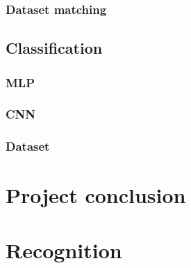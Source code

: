 \documentclass[11pt,a4paper,UKenglish]{article}
\begin{document}
\subsubsection{Dataset matching}

\subsection{Classification}

\subsubsection{MLP}
\subsubsection{CNN}
\subsubsection{Dataset}


\section{Project conclusion}
\label{sec:Project conclusion}

\section{Recognition}
\label{sec:Recognition}




\end{document}
